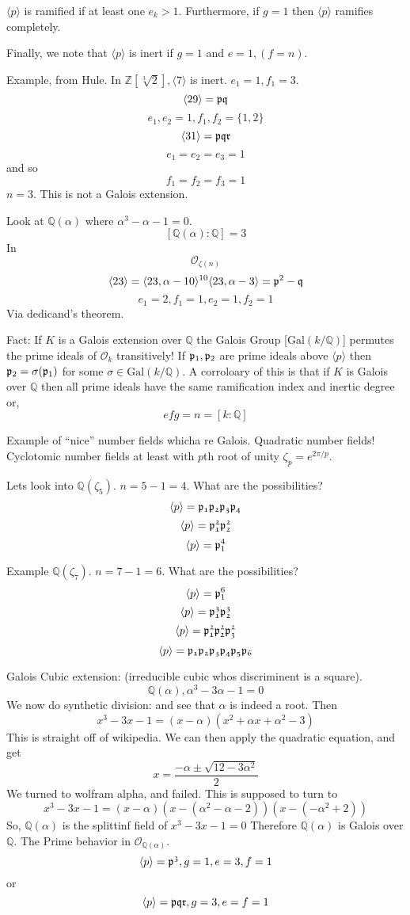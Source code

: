 \documentclass{article}
\begin{document}
$\langle p \rangle$ is ramified if at least one $e_k > 1$. Furthermore, if $g =
1$ then $\langle p \rangle$ ramifies completely. 

Finally, we note that $\langle p \rangle$ is inert if  $g = 1$ and $e = 1, (f =
n)$. 

Example, from Hule. In $\mathbb{Z}[\sqrt[3]{2}], \langle 7 \rangle$ is inert.
$e_1 =1, f_1 = 3$. 
\[ \langle 29 \rangle = \frak{pq} \]
\[ e_1, e_2 = 1, f_1, f_2 = \{1,2\} \]
\[ \langle 31 \rangle = \frak{pqr} \]
\[ e_1 = e_2 = e_3 = 1 \]
and so
\[ f_1 = f_2 = f_3 = 1 \]
$n = 3$. This is not a Galois extension. 

Look at $\mathbb{Q}(\alpha)$ where $\alpha^3 - \alpha -1 = 0$.
\[ [ \mathbb{Q}(\alpha) : \mathbb{Q}] = 3 \]
In 
\[ \mathcal{O}_{\zeta(n)} \]
\[ \langle 23 \rangle = \langle 23, \alpha - 10 \rangle^{10} \langle 23, \alpha
- 3 \rangle = \frak{p}^2 - \frak{q} \]
\[ e_1= 2, f_1 = 1, e_2 = 1, f_2 = 1 \]
Via dedicand's theorem.

Fact: If $K$ is a Galois extension over $\mathbb{Q}$ the Galois Group
[$\text{Gal}(k/\mathbb{Q})$] permutes the prime ideals of $\mathcal{O}_{k}$
transitively! If $\mathfrak{p}_1,\frak{p}_2$ are prime ideals above $\langle p
\rangle$ then $\frak{p}_2 = \sigma(\frak{p}_1)$ for some $\sigma \in
\text{Gal}(k/\mathbb{Q})$. A corroloary of this is that if $K$ is Galois over
$\mathbb{Q}$ then all prime ideals have the same ramification index and inertic
degree or, 
\[ efg = n = [k:\mathbb{Q}] \]

Example of ``nice'' number fields whicha re Galois. Quadratic number fields!
Cyclotomic number fields at least with $p$th root of unity $\zeta_p = e^{2 \pi /
p }$. 

Lets look into $\mathbb{Q}(\zeta_5)$. $n = 5-1 = 4$. What are the possibilities?
\[ \langle p \rangle = \frak{p_1p_2p_3p_4} \]
\[ \langle p \rangle = \frak{p_1^2 p_2^2} \]
\[ \langle p \rangle = \frak{p}_1^4 \]

Example $\mathbb{Q}(\zeta_7)$. $n = 7-1 = 6$. What are the possibilities?
\[ \langle p \rangle = \frak{p}_1^6 \]
\[ \langle p \rangle = \frak{p_1^3p_2^3} \]
\[ \langle p \rangle = \frak{p_1^2p_2^2p_3^2} \]
\[ \langle p \rangle = \frak{p_1p_2p_3p_4p_5p_6} \]

Galois Cubic extension: (irreducible cubic whos discriminent is a square). 
\[ \mathbb{Q}(\alpha), \alpha^3-3\alpha-1 = 0 \]
We now do synthetic division: and see that $\alpha$ is indeed a root. Then
\[ x^3 -3x -1 = (x - \alpha)( x^2 + \alpha x + \alpha^2-3) \]
This is straight off of wikipedia. We can then apply the quadratic equation, and
get
\[ x = \frac{-\alpha \pm \sqrt{12 - 3 \alpha^2}}{2} \]
We turned to wolfram alpha, and failed. This is supposed to turn to
\[ x^3 - 3x -1 = (x - \alpha)(x-(\alpha^2 - \alpha -2))(x-(-\alpha^2+2)) \]
So, $\mathbb{Q}(\alpha)$ is the splittinf field of $x^3-3x-1 = 0$ Therefore
$\mathbb{Q}(\alpha)$ is Galois over $\mathbb{Q}$. The Prime behavior in
$\mathcal{O}_{\mathbb{Q}(\alpha)}$. 
\[ \langle p \rangle = \frak{p^3}, g = 1, e = 3, f = 1 \]
or 
\[ \langle p \rangle = \frak{pqr}, g = 3, e = f = 1 \]
\end{document}
